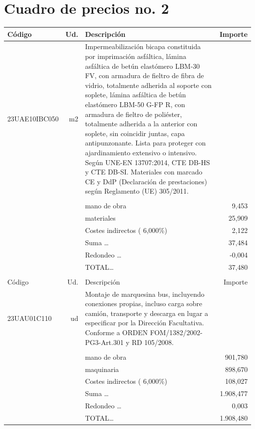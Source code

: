 \part{Cuadro de precios no. 2}%
\label{sec:Cuadrodepreciosno.2}%
\parttoc%
\setcounter{chapter}{0}%
\small%
\tablefirsthead{}%
\tablehead{}%
%
\tablelasttail{}%
\begin{supertabular}{l r p{60mm} r}%
Código&Ud.&Descripción&Importe\\%
\hline%
23UAE10IBC050&m2&Impermeabilización bicapa constituida por imprimación asfáltica, lámina asfáltica de betún elastómero LBM{-}30 FV, con armadura de fieltro de fibra de vidrio, totalmente adherida al soporte con soplete, lámina asfáltica de betún elastómero LBM{-}50 G{-}FP R, con armadura de fieltro de poliéster, totalmente adherida a la anterior con soplete, sin coincidir juntas, capa antipunzonante. Lista para proteger con ajardinamiento extensivo o intensivo. Según UNE{-}EN 13707:2014, CTE DB{-}HS y CTE DB{-}SI. Materiales con marcado CE y DdP (Declaración de prestaciones) según Reglamento (UE) 305/2011.&\\%
&&&\\%
&&mano de obra&     9,453\\%
&&materiales&    25,909\\%
&&Costes indirectos (     6,000\%)&     2,122\\%
&&Suma \ldots&    37,484\\%
&&Redondeo \ldots&    {-}0,004\\%
%
&&TOTAL\ldots&    37,480\\%
&&&\\%
Código&Ud.&Descripción&Importe\\%
\hline%
23UAU01C110&ud&Montaje de marquesina bus, incluyendo conexiones propias, incluso carga sobre camión, transporte y descarga en lugar a especificar por la Dirección Facultativa. Conforme a ORDEN FOM/1382/2002{-}PG3{-}Art.301 y RD 105/2008.&\\%
&&&\\%
&&mano de obra&   901,780\\%
&&maquinaria&   898,670\\%
&&Costes indirectos (     6,000\%)&   108,027\\%
&&Suma \ldots& 1.908,477\\%
&&Redondeo \ldots&     0,003\\%
%
&&TOTAL\ldots& 1.908,480\\%

\end{supertabular}
